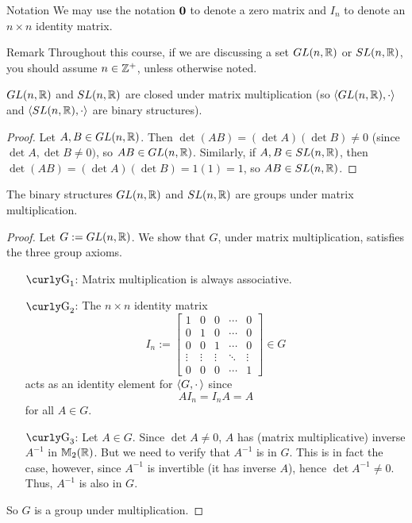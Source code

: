 \begin{df}{Notation} We may use the notation $\mathbf 0$ to denote a zero matrix and $I_n$ to denote an $n\times n$ identity matrix.\end{df}

\begin{df}{Remark} Throughout this course, if we are discussing a set $GL(n,\mathbb{R})$ or $SL(n,\mathbb{R})$, you should assume $n\in \mathbb{Z}^+$, unless otherwise noted.\end{df}

\begin{thm}\label{glsl} $GL(n,\mathbb{R})$ and $SL(n,\mathbb{R})$ are closed under matrix multiplication (so $\langle GL(n,\mathbb{R}),\cdot\rangle$ and $\langle SL(n,\mathbb{R}),\cdot\rangle$ are binary structures).\end{thm}

\begin{proof} Let $A,B\in GL(n, \mathbb{R})$. Then $\det(AB)=(\det A)(\det B) \neq 0$ (since $\det A, \det B \neq 0)$, so $AB\in GL(n,\mathbb{R})$.  Similarly, if $A,B \in SL(n,\mathbb{R})$, then $\det(AB)=(\det A)(\det B)=1(1)=1$, so $AB\in SL(n,\mathbb{R})$.\end{proof}

\begin{example}{} The binary structures
 $GL(n,\mathbb{R})$ and $SL(n,\mathbb{R})$ are groups under matrix multiplication.

\begin{proof} Let $G:=GL(n,\mathbb{R})$. We show that $G$, under matrix multiplication, satisfies
the three group axioms.
\begin{enumerate}
\item[$\G_1$:] Matrix multiplication is always associative.
\item[$\G_2$:] The $n\times n$ identity matrix
    $$I_n:=\begin{bmatrix}
1 & 0 & 0 & \cdots & 0 \\
0 & 1 & 0 & \cdots & 0 \\
0 & 0 & 1 & \cdots & 0 \\
\vdots & \vdots & \vdots & \ddots & \vdots \\
0 & 0 & 0 & \cdots & 1 \end{bmatrix} \in G$$
acts as an identity element for $\langle G, \cdot\,\rangle$ since $$AI_n=I_nA = A$$ for all $A\in G$.
\item[$\G_3$:] Let $A\in G$.  Since $\det A\neq 0$, $A$ has
    (matrix multiplicative) inverse $A^{-1}$ in
    $\mathbb{M}_2(\mathbb{R})$. But we need to verify that $A^{-1}$ is in
    $G$. This is in fact the case, however, since
    $A^{-1}$ is invertible (it has inverse $A$), hence $\det
    A^{-1} \neq 0$.  Thus, $A^{-1}$ is also in $G$.
    \end{enumerate}

So $G$ is a group under multiplication.

\end{proof} \end{example}

